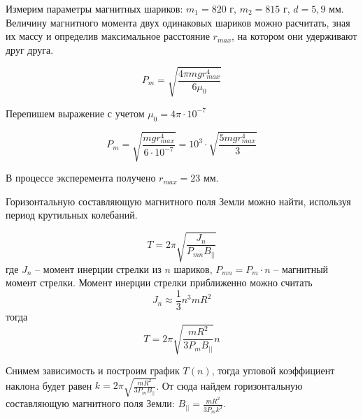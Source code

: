 



    Измерим параметры магнитных шариков: $m_1 = 820$ г, $m_2 = 815$ г, $d = 5,9$ мм.\\
    Величину магнитного момента двух одинаковых шариков можно расчитать, зная их массу и определив
    максимальное расстояние $r_{max}$, на котором они удерживают друг друга.

    \begin{equation*}
        P_m = \sqrt{\frac{4 \pi mg r_{max}^4}{6 \mu_0}}
    \end{equation*}

    Перепишем выражение с учетом $\mu_0 = 4 \pi \cdot 10^{-7}$

    \begin{equation*}
        P_m = \sqrt{\frac{mg r_{max}^4}{6 \cdot 10^{-7}}} = 10^3 \cdot \sqrt{\frac{5 mg r_{max}^4}{3}}
    \end{equation*}

    В процессе эксперемента получено $r_{max} = 23$ мм.

    \begin{center}
    \end{center}

    Горизонтальную составляющую магнитного поля Земли можно найти, используя период крутильных колебаний.

    \begin{equation*}
        T = 2 \pi \sqrt{\frac{J_n}{P_{mn} B_{||}}}
    \end{equation*}
    где $J_n$ -- момент инерции стрелки из $n$ шариков, $P_{mn} = P_m \cdot n$ -- магнитный момент стрелки.
    Момент инерции стрелки приближенно можно считать
    \begin{equation*}
        J_n \approx \frac{1}{3} n^3 m R^2
    \end{equation*} 
    тогда
    \begin{equation*}
        T = 2 \pi \sqrt{\frac{m R^2}{3 P_m B_{||}}} n
    \end{equation*}

    Снимем зависимость и построим график $T(n)$, тогда угловой коэффициент наклона будет равен $k = 2 \pi \sqrt{\frac{m R^2}{3 P_m B_{||}}}$.
    От сюда найдем горизонтальную составляющую магнитного поля Земли: $B_{||} = \frac{m R^2}{3 P_m k^2}$.


    \begin{center}
    \end{center}

